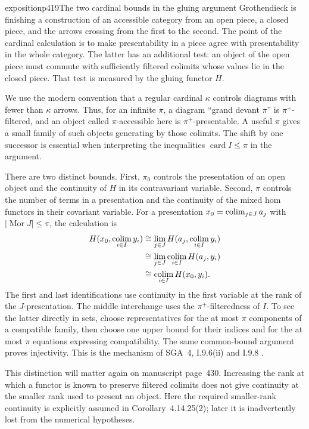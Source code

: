 
\begin{dcomment}{exposition}{p419}{The two cardinal bounds in the gluing argument}
Grothendieck is finishing a construction of an accessible category from an open piece, a closed piece, and the arrows crossing from the first to the second. The point of the cardinal calculation is to make presentability in a piece agree with presentability in the whole category. The latter has an additional test: an object of the open piece must commute with sufficiently filtered colimits whose values lie in the closed piece. That test is measured by the gluing functor $H$.

We use the modern convention that a regular cardinal $\kappa$ controls diagrams with fewer than $\kappa$ arrows. Thus, for an infinite $\pi$, a diagram ``grand devant $\pi$'' is $\pi^+$-filtered, and an object called $\pi$-accessible here is $\pi^+$-presentable. A useful $\pi$ gives a small family of such objects generating by those colimits. The shift by one successor is essential when interpreting the inequalities $\operatorname{card}I\leq\pi$ in the argument.

There are two distinct bounds. First, $\pi_0$ controls the presentation of an open object and the continuity of $H$ in its contravariant variable. Second, $\pi$ controls the number of terms in a presentation and the continuity of the mixed hom functors in their covariant variable. For a presentation $x_0=\mathop{\rm colim}_{j\in J}a_j$ with $|\operatorname{Mor}J|\leq\pi$, the calculation is
\[
 \begin{aligned}
 H(x_0,\mathop{\rm colim}_{i\in I}y_i)
 &\cong\lim_{j\in J}H(a_j,\mathop{\rm colim}_{i\in I}y_i)\\
 &\cong\lim_{j\in J}\mathop{\rm colim}_{i\in I}H(a_j,y_i)\\
 &\cong\mathop{\rm colim}_{i\in I}H(x_0,y_i).
 \end{aligned}
\]
The first and last identifications use continuity in the first variable at the rank of the $J$-presentation. The middle interchange uses the $\pi^+$-filteredness of $I$. To see the latter directly in sets, choose representatives for the at most $\pi$ components of a compatible family, then choose one upper bound for their indices and for the at most $\pi$ equations expressing compatibility. The same common-bound argument proves injectivity. This is the mechanism of SGA~4, I.9.6(ii) and I.9.8 \citep{SGA4I1972}.

This distinction will matter again on manuscript page~430. Increasing the rank at which a functor is known to preserve filtered colimits does not give continuity at the smaller rank used to present an object. Here the required smaller-rank continuity is explicitly assumed in Corollary~4.14.25(2); later it is inadvertently lost from the numerical hypotheses.
\end{dcomment}

